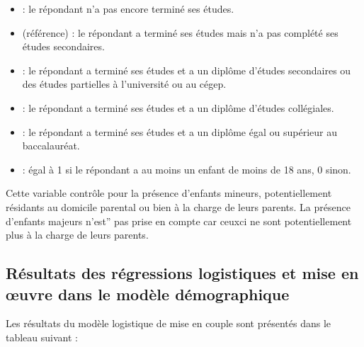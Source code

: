 \documentclass[letterpaper,10pt,french]{sphinxmanual}
\begin{document}
\begin{itemize}
\item {} 
 : le répondant n’a pas encore terminé ses études.

\item {} 
 (référence) : le répondant a terminé ses études mais n’a pas complété ses études secondaires.

\item {} 
 : le répondant a terminé ses études et a un diplôme d’études secondaires ou des études partielles à l’université ou au cégep.

\item {} 
 : le répondant a terminé ses études et a un diplôme d’études collégiales.

\item {} 
 : le répondant a terminé ses études et a un diplôme égal ou supérieur au baccalauréat.

\end{itemize}

\begin{itemize}
\item {} 
 : égal à 1 si le répondant a au moins un enfant de moins de 18 ans, 0 sinon.

\end{itemize}

Cette variable contrôle pour la présence d’enfants mineurs, potentiellement résidants au domicile parental ou bien à la charge de leurs parents. La présence d’enfants majeurs n’est” pas prise en compte car ceux\sphinxhyphen{}ci ne sont potentiellement plus à la charge de leurs parents.


\subsection{Résultats des régressions logistiques et mise en œuvre dans le modèle démographique}
\label{\detokenize{transition_models:id9}}
Les résultats du modèle logistique de mise en couple sont présentés dans le tableau suivant :
\end{document}
